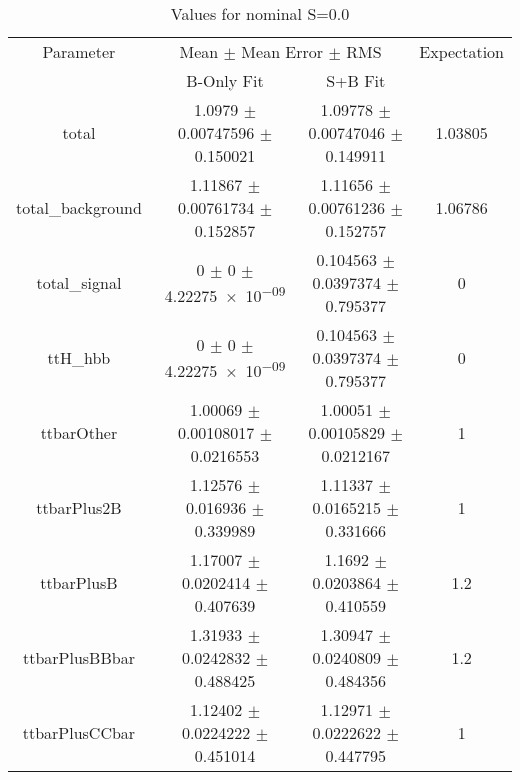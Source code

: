 \begin{table}
\centering
\caption{Values for nominal S=0.0}
\begin{tabular}{cccc}
\toprule
Parameter & \multicolumn{2}{c}{Mean $\pm$ Mean Error $\pm$ RMS} & Expectation\\
 & B-Only Fit & S+B Fit & \\
\midrule
total & \num{1.0979} $\pm$ \num{0.00747596} $\pm$ \num{0.150021} & \num{1.09778} $\pm$ \num{0.00747046} $\pm$ \num{0.149911} & \num{1.03805}\\
total\_background & \num{1.11867} $\pm$ \num{0.00761734} $\pm$ \num{0.152857} & \num{1.11656} $\pm$ \num{0.00761236} $\pm$ \num{0.152757} & \num{1.06786}\\
total\_signal & \num{0} $\pm$ \num{0} $\pm$ \num{4.22275e-09} & \num{0.104563} $\pm$ \num{0.0397374} $\pm$ \num{0.795377} & \num{0}\\
ttH\_hbb & \num{0} $\pm$ \num{0} $\pm$ \num{4.22275e-09} & \num{0.104563} $\pm$ \num{0.0397374} $\pm$ \num{0.795377} & \num{0}\\
ttbarOther & \num{1.00069} $\pm$ \num{0.00108017} $\pm$ \num{0.0216553} & \num{1.00051} $\pm$ \num{0.00105829} $\pm$ \num{0.0212167} & \num{1}\\
ttbarPlus2B & \num{1.12576} $\pm$ \num{0.016936} $\pm$ \num{0.339989} & \num{1.11337} $\pm$ \num{0.0165215} $\pm$ \num{0.331666} & \num{1}\\
ttbarPlusB & \num{1.17007} $\pm$ \num{0.0202414} $\pm$ \num{0.407639} & \num{1.1692} $\pm$ \num{0.0203864} $\pm$ \num{0.410559} & \num{1.2}\\
ttbarPlusBBbar & \num{1.31933} $\pm$ \num{0.0242832} $\pm$ \num{0.488425} & \num{1.30947} $\pm$ \num{0.0240809} $\pm$ \num{0.484356} & \num{1.2}\\
ttbarPlusCCbar & \num{1.12402} $\pm$ \num{0.0224222} $\pm$ \num{0.451014} & \num{1.12971} $\pm$ \num{0.0222622} $\pm$ \num{0.447795} & \num{1}\\
\bottomrule
\end{tabular}
\end{table}